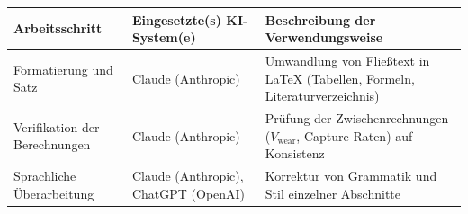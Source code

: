 \documentclass[conference,a4paper]{IEEEtran}
\begin{document}
\vspace{0.3em}
\noindent
\begin{tabular}{|p{}|p{}|p{}|}
\hline
\textbf{Arbeitsschritt} & \textbf{Eingesetzte(s) KI-System(e)} & \textbf{Beschreibung der Verwendungsweise} \\
\hline
Formatierung und Satz & Claude (Anthropic) & Umwandlung von Fließtext in \LaTeX{} (Tabellen, Formeln, Literaturverzeichnis) \\[4ex]
\hline
Verifikation der Berechnungen & Claude (Anthropic) & Prüfung der Zwischenrechnungen ($V_{\mathrm{wear}}$, Capture-Raten) auf Konsistenz \\[4ex]
\hline
Sprachliche Überarbeitung & Claude (Anthropic), ChatGPT (OpenAI) & Korrektur von Grammatik und Stil einzelner Abschnitte \\[4ex]
\hline
\end{tabular}
 
\end{document}

